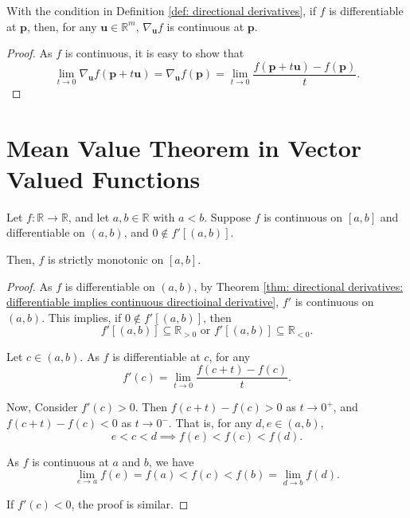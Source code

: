 \begin{theorem}
	\label{thm: directional derivatives: differentiable implies continuous directioinal derivative}
	With the condition in Definition \ref{def: directional derivatives}, if $f$ is differentiable at $\mathbf p$, then, for any $\mathbf u \in \mathbb R^m$, $\nabla_{\mathbf u} f$ is continuous at $\mathbf p$.
	
	\begin{proof}
		As $f$ is continuous, it is easy to show that
		$$
		\lim_{t \to 0}\nabla_{\mathbf u} f(\mathbf p + t\mathbf u) = \nabla_{\mathbf u} f(\mathbf p) = \lim_{t \to 0} \frac{f(\mathbf p + t\mathbf u) - f(\mathbf p)}{t}.
		$$
	\end{proof}
\end{theorem}





\section{Mean Value Theorem in Vector Valued Functions}


\begin{lemma}
	\label{lm: non-zero derivative implies monotonic}
	Let $f: \mathbb R \to \mathbb R$, and let $a, b \in \mathbb R$ with $a < b$. Suppose $f$ is continuous on $[a,b]$ and differentiable on $(a,b)$, and $0 \notin f'[(a,b)]$.
	
	Then, $f$ is strictly monotonic on $[a,b]$.
	
	\begin{proof}
		As $f$ is differentiable on $(a,b)$, by Theorem \ref{thm: directional derivatives: differentiable implies continuous directioinal derivative}, $f'$ is continuous on $(a,b)$. This implies, if $0 \notin f'[(a,b)]$, then
		$$
		f'[(a,b)] \subseteq \mathbb R_{> 0} \text{ or } f'[(a,b)] \subseteq \mathbb R_{< 0}.
		$$
	
	
		Let $c \in (a,b)$. As $f$ is differentiable at $c$, for any 
		$$
		f'(c) = \lim_{t \to 0} \frac{f(c + t) - f(c)}{t}.
		$$
		
		Now, Consider $f'(c) > 0$. Then $f(c + t) - f(c) > 0$ as $t \to 0^+$, and $f(c + t) - f(c) < 0$ as $t \to 0^-$. That is, for any $d, e \in (a,b)$,
		$$
		e < c < d \implies f(e) < f(c) < f(d).
		$$
		
		As $f$ is continuous at $a$ and $b$, we have
		$$
		\lim_{e \to a} f(e) = f(a) < f(c) < f(b) = \lim_{d \to b} f(d).
		$$
		
		If $f'(c) < 0$, the proof is similar.
	\end{proof}
\end{lemma}



